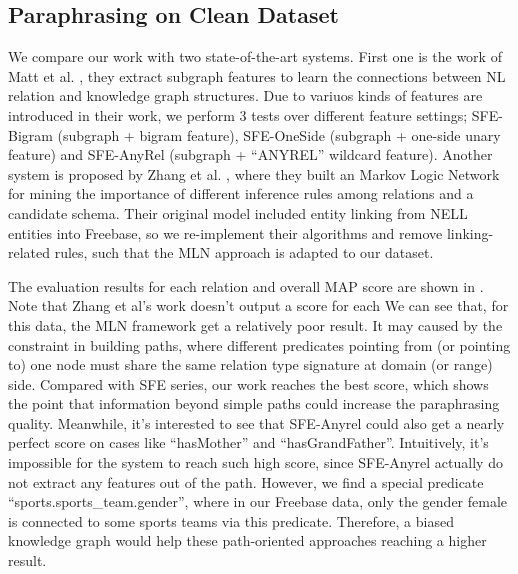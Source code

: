 \subsection{Paraphrasing on Clean Dataset}
We compare our work with two state-of-the-art systems. First one is the work of
Matt et al. \cite{gardnerefficient}, they extract subgraph features to learn the connections
between NL relation and knowledge graph structures. Due to variuos kinds of features
are introduced in their work, we perform 3 tests over different feature settings;
SFE-Bigram (subgraph + bigram feature), SFE-OneSide (subgraph + one-side unary feature) and
SFE-AnyRel (subgraph + ``ANYREL'' wildcard feature). Another system is proposed by
Zhang et al. \cite{zhang2012ontological}, where they built an Markov Logic Network for 
mining the importance of different inference rules among relations and a candidate schema.
Their original model included entity linking from NELL entities into Freebase, 
so we re-implement their algorithms and remove linking-related rules, such that the MLN
approach is adapted to our dataset. 

The evaluation results for each relation and overall MAP score are shown in .
Note that Zhang et al's work doesn't output a score for each 
We can see that, for this data, the MLN framework get a relatively poor result.
It may caused by the constraint in building paths, where different predicates pointing from (or
pointing to) one node must share the same relation type signature at domain (or range) side.
Compared with SFE series, our work reaches the best score, which shows the point that
information beyond simple paths could increase the paraphrasing quality.
Meanwhile, it's interested to see that SFE-Anyrel could also get a nearly perfect score
on cases like ``hasMother'' and ``hasGrandFather''.
Intuitively, it's impossible for the system to reach such high score, since SFE-Anyrel
actually do not extract any features out of the path. 
However, we find a special predicate ``sports.sports\_team.gender'', where in our Freebase
data, only the gender female is connected to some sports teams via this predicate.
Therefore, a biased knowledge graph would help these path-oriented approaches reaching a
higher result.




